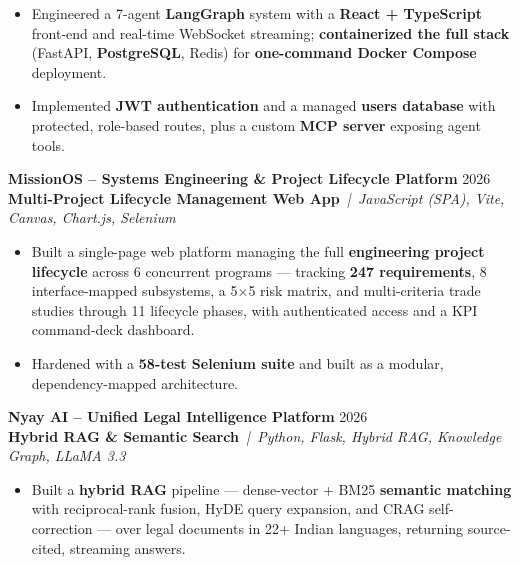 \documentclass[a4paper,10pt]{article}
\newcommand{\projectEntry}[4]{%
  \vspace{1pt}%
  \noindent\textbf{\color{HeaderDark}#1} \hfill {\small\color{SubText}#2}\\[-4pt]%
  {\scriptsize\color{AccentTeal}\textbf{#3}} {\scriptsize\color{TechTag}\textit{\,|\, #4}}%
  \vspace{0pt}\par%
}
\begin{document}
\begin{itemize}[leftmargin=14pt, itemsep=0pt, parsep=0pt, topsep=1pt, label={\color{BulletColor}\textbf{--}}]
  \item {\small Engineered a 7-agent \textbf{LangGraph} system with a \textbf{React + TypeScript} front-end and real-time WebSocket streaming; \textbf{containerized the full stack} (FastAPI, \textbf{PostgreSQL}, Redis) for \textbf{one-command Docker Compose} deployment.}
  \item {\small Implemented \textbf{JWT authentication} and a managed \textbf{users database} with protected, role-based routes, plus a custom \textbf{MCP server} exposing agent tools.}
\end{itemize}

\vspace{1pt}

\projectEntry{MissionOS -- Systems Engineering \& Project Lifecycle Platform}
  {2026}
  {Multi-Project Lifecycle Management Web App}
  {JavaScript (SPA), Vite, Canvas, Chart.js, Selenium}

\begin{itemize}[leftmargin=14pt, itemsep=0pt, parsep=0pt, topsep=1pt, label={\color{BulletColor}\textbf{--}}]
  \item {\small Built a single-page web platform managing the full \textbf{engineering project lifecycle} across 6 concurrent programs --- tracking \textbf{247 requirements}, 8 interface-mapped subsystems, a 5$\times$5 risk matrix, and multi-criteria trade studies through 11 lifecycle phases, with authenticated access and a KPI command-deck dashboard.}
  \item {\small Hardened with a \textbf{58-test Selenium suite} and built as a modular, dependency-mapped architecture.}
\end{itemize}

\vspace{1pt}

\projectEntry{Nyay AI -- Unified Legal Intelligence Platform}
  {2026}
  {Hybrid RAG \& Semantic Search}
  {Python, Flask, Hybrid RAG, Knowledge Graph, LLaMA 3.3}

\begin{itemize}[leftmargin=14pt, itemsep=0pt, parsep=0pt, topsep=1pt, label={\color{BulletColor}\textbf{--}}]
  \item {\small Built a \textbf{hybrid RAG} pipeline --- dense-vector + BM25 \textbf{semantic matching} with reciprocal-rank fusion, HyDE query expansion, and CRAG self-correction --- over legal documents in 22+ Indian languages, returning source-cited, streaming answers.}
\end{itemize}
\end{document}
